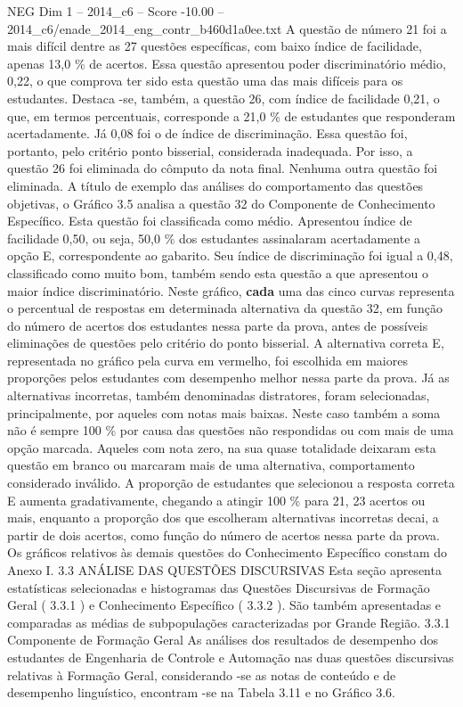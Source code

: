 \begin{textsample}{NEG Dim 1 – 2014\_c6 – Score -10.00 – 2014\_c6/enade\_2014\_eng\_contr\_b460d1a0ee.txt}
A questão de número 21 foi a mais difícil dentre as 27 questões específicas, com baixo índice de facilidade, apenas 13,0 \% de acertos.
Essa questão apresentou poder discriminatório médio, 0,22, o que comprova ter sido esta questão uma das mais difíceis para os estudantes.
Destaca -se, também, a questão 26, com índice de facilidade 0,21, o que, em termos percentuais, corresponde a 21,0 \% de estudantes que responderam acertadamente.
Já 0,08 foi o de índice de discriminação.
Essa questão foi, portanto, pelo critério ponto bisserial, considerada inadequada.
Por isso, a questão 26 foi eliminada do cômputo da nota final.
Nenhuma outra questão foi eliminada.
A título de exemplo das análises do comportamento das questões objetivas, o Gráfico 3.5 analisa a questão 32 do Componente de Conhecimento Específico.
Esta questão foi classificada como médio.
Apresentou índice de facilidade 0,50, ou seja, 50,0 \% dos estudantes assinalaram acertadamente a opção E, correspondente ao gabarito.
Seu índice de discriminação foi igual a 0,48, classificado como muito bom, também sendo esta questão a que apresentou o maior índice discriminatório.
Neste gráfico, \textbf{cada} uma das cinco curvas representa o percentual de respostas em determinada alternativa da questão 32, em função do número de acertos dos estudantes nessa parte da prova, antes de possíveis eliminações de questões pelo critério do ponto bisserial.
A alternativa correta E, representada no gráfico pela curva em vermelho, foi escolhida em maiores proporções pelos estudantes com desempenho melhor nessa parte da prova.
Já as alternativas incorretas, também denominadas distratores, foram selecionadas, principalmente, por aqueles com notas mais baixas.
Neste caso também a soma não é sempre 100 \% por causa das questões não respondidas ou com mais de uma opção marcada.
Aqueles com nota zero, na sua quase totalidade deixaram esta questão em branco ou marcaram mais de uma alternativa, comportamento considerado inválido.
A proporção de estudantes que selecionou a resposta correta E aumenta gradativamente, chegando a atingir 100 \% para 21, 23 acertos ou mais, enquanto a proporção dos que escolheram alternativas incorretas decai, a partir de dois acertos, como função do número de acertos nessa parte da prova.
Os gráficos relativos às demais questões do Conhecimento Específico constam do Anexo I. 3.3 ANÁLISE DAS QUESTÕES DISCURSIVAS Esta seção apresenta estatísticas selecionadas e histogramas das Questões Discursivas de Formação Geral ( 3.3.1 ) e Conhecimento Específico ( 3.3.2 ).
São também apresentadas e comparadas as médias de subpopulações caracterizadas por Grande Região. 3.3.1 Componente de Formação Geral As análises dos resultados de desempenho dos estudantes de Engenharia de Controle e Automação nas duas questões discursivas relativas à Formação Geral, considerando -se as notas de conteúdo e de desempenho linguístico, encontram -se na Tabela 3.11 e no Gráfico 3.6.

\end{textsample}
